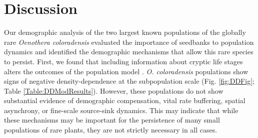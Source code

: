 \documentclass[12pt, letterpaper]{article}
\begin{document}

\section{Discussion}
\normalfont Our demographic analysis of the two largest known populations of the globally rare \textit{Oenothera coloradensis} evaluated the importance of seedbanks to population dynamics and identified the demographic mechanisms that allow this rare species to persist. First, we found that including information about cryptic life stages alters the outcomes of the population model \cite{Paniw2017, Nguyen2019ConsequencesModels}. \textit{O. coloradensis} populations show signs of negative density-dependence at the subpopulation scale (Fig. \ref{fig:DDFig}; Table \ref{Table:DDModResults}). However, these populations do not show substantial evidence of demographic compensation, vital rate buffering, spatial asynchrony, or fine-scale source-sink dynamics. This may indicate that while these mechanisms may be important for the persistence of many small populations of rare plants, they are not strictly necessary in all cases. 
\end{document}
